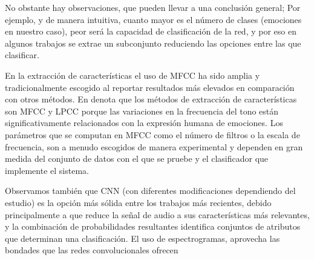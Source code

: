 \documentclass[11pt,a4paper,spanish]{book}
\begin{document}
	No obstante hay observaciones, que pueden llevar a una conclusión general; Por ejemplo, y de manera intuitiva, cuanto mayor es el número de clases (emociones en nuestro caso), peor será la capacidad de clasificación de la red, y por eso en algunos trabajos se extrae un subconjunto reduciendo las opciones entre las que clasificar.  
	
	En la extracción de características el uso de MFCC ha sido amplia y tradicionalmente escogido al reportar resultados más elevados en comparación con otros métodos. En \cite{Langari2020} denota que los métodos de extracción de características son MFCC y LPCC porque las variaciones en la frecuencia del tono están significativamente relacionados con la expresión humana de emociones. Los parámetros que se computan en MFCC como el número de filtros o la escala de frecuencia, son a menudo escogidos de manera experimental y dependen en gran medida del conjunto de datos con el que se pruebe y el clasificador que implemente el sistema.
	
	Observamos también que CNN (con diferentes modificaciones dependiendo del estudio) es la opción más sólida entre los trabajos más recientes, debido principalmente a que reduce la señal de audio a sus características más relevantes, y la combinación de probabilidades resultantes identifica conjuntos de atributos que determinan una clasificación. El uso de espectrogramas, aprovecha las bondades que las redes convolucionales ofrecen
	

	
	\printbibliography
\end{document}

